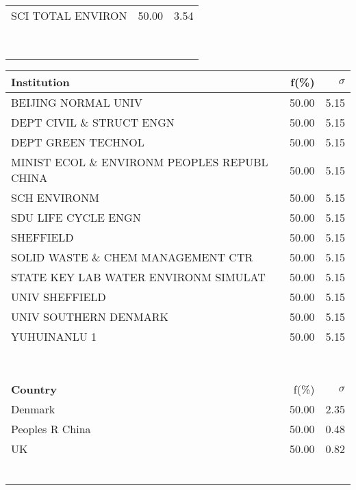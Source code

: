 \documentclass[a4paper,11pt]{report}
\begin{document}
\begin{landscape}
\begin{table}[!ht]
{\begin{tabular}{|p{5cm} r r|}
SCI TOTAL ENVIRON & 50.00 & 3.54\\
 &  & \\
 &  & \\
 &  & \\
 &  & \\
 &  & \\
 &  & \\
 &  & \\
 &  & \\
\hline
\end{tabular}
}
{\scriptsize\begin{tabular}{|p{5cm} r r|}
\hline
{\bf Institution }& f(\%) & $\sigma$\\
\hline
BEIJING NORMAL UNIV & 50.00 & 5.15\\
DEPT CIVIL \& STRUCT ENGN & 50.00 & 5.15\\
DEPT GREEN TECHNOL & 50.00 & 5.15\\
MINIST ECOL \& ENVIRONM PEOPLES REPUBL CHINA & 50.00 & 5.15\\
SCH ENVIRONM & 50.00 & 5.15\\
SDU LIFE CYCLE ENGN & 50.00 & 5.15\\
SHEFFIELD & 50.00 & 5.15\\
SOLID WASTE \& CHEM MANAGEMENT CTR & 50.00 & 5.15\\
STATE KEY LAB WATER ENVIRONM SIMULAT & 50.00 & 5.15\\
UNIV SHEFFIELD & 50.00 & 5.15\\
UNIV SOUTHERN DENMARK & 50.00 & 5.15\\
YUHUINANLU 1 & 50.00 & 5.15\\
 &  & \\
 &  & \\
 &  & \\
 &  & \\
 &  & \\
 &  & \\
 &  & \\
 &  & \\
\hline
{\bf Country }& f(\%) & $\sigma$\\
\hline
Denmark & 50.00 & 2.35\\
Peoples R China & 50.00 & 0.48\\
UK & 50.00 & 0.82\\
 &  & \\
 &  & \\
 &  & \\
 &  & \\
 &  & \\
 &  & \\

\end{tabular}}
\end{table}
\end{landscape}
\end{document}
